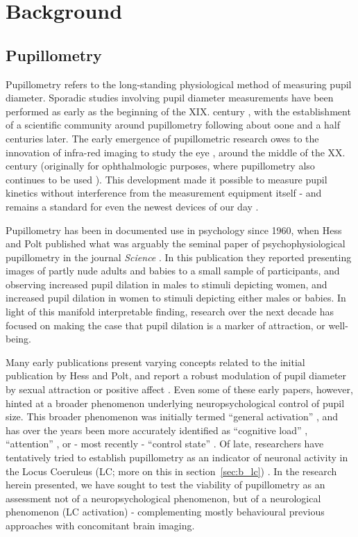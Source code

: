 \chapter{Background}
    \section{Pupillometry}\label{sec:b_p}
	Pupillometry refers to the long-standing physiological method of measuring pupil diameter.
	Sporadic studies involving pupil diameter measurements have been performed as early as the beginning of the XIX. century \citep{Loewenfeld1958},
	with the establishment of a scientific community around pupillometry following about oone and a half centuries later.
	The early emergence of pupillometric research owes to the innovation of infra-red imaging to study the eye \citep{Dubois1955}, around the middle of the XX. century (originally for ophthalmologic purposes, where pupillometry also continues to be used \citep{Thompson2012}).
	This development made it possible to measure pupil kinetics without interference from the measurement equipment itself - and remains a standard for even the newest devices of our day \citep{Bradley2010}.
	
	Pupillometry has been in documented use in psychology since 1960, when Hess and Polt published what was arguably the seminal paper of psychophysiological pupillometry in the journal \textit{Science} \citep{HESS1960}.
	In this publication they reported presenting images of partly nude adults and babies to a small sample of participants, and observing increased pupil dilation in males to stimuli depicting women, and increased pupil dilation in women to stimuli depicting either males or babies.
	In light of this manifold interpretable finding, research over the next decade has focused on making the case that pupil dilation is a marker of attraction, or well-being.
	
	Many early publications present varying concepts related to the initial publication by Hess and Polt, and report a robust modulation of pupil diameter by sexual attraction \citep{Goldwater1972, HESS1965} or positive affect \citep{Nunally1967, Bradshaw1967}.
	Even some of these early papers, however, hinted at a broader phenomenon underlying neuropsychological control of pupil size.
	This broader phenomenon was initially termed “general activation” \citep{Nunally1967}, and has over the years been more accurately identified as “cognitive load” \citep{Laeng2011,Zekveld2011}, “attention” \citep{Wykowska2013,Kraemer2000}, or - most recently - “control state” \citep{Hayes2013}.
	Of late, researchers have tentatively tried to establish pupillometry as an indicator of neuronal activity in the Locus Coeruleus (LC; more on this in section~\ref{sec:b_lc}) \citep{Gilzenrat2010}.
	In the research herein presented, we have sought to test the viability of pupillometry as an assessment not of a neuropsychological phenomenon, but of a neurological phenomenon (LC activation) - 
	complementing mostly behavioural previous approaches \citep{Gilzenrat2010,Granholm2004} with concomitant brain imaging.
	
